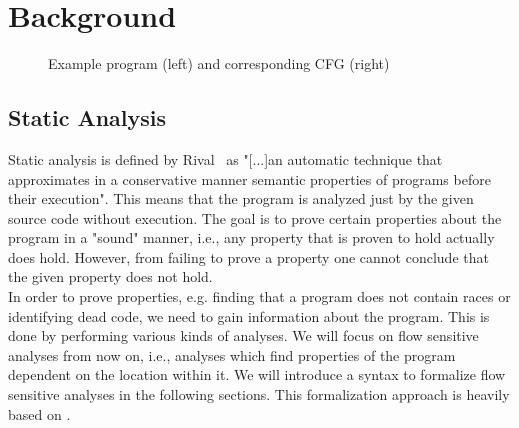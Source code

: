 
\chapter{Background}\label{chapter:background}

\begin{figure}
  \centering
  \begin{subfigure}{.35\textwidth}
    \centering
    
  \end{subfigure}
  \begin{subfigure}{.35\textwidth}
    \centering
  \end{subfigure}
  \caption{Example program (left) and corresponding CFG (right)}
  \label{fig:example_cfg}
\end{figure}

  \section{Static Analysis}
  Static analysis is defined by Rival~\parencite{rival2020introduction} as "[...]an automatic technique that approximates in a conservative manner semantic properties of programs before their execution". This means that the program is analyzed just by the given source code without execution. The goal is to prove certain properties about the program in a "sound" manner, i.e., any property that is proven to hold actually does hold. However, from failing to prove a property one cannot conclude that the given property does not hold.\\
  In order to prove properties, e.g. finding that a program does not contain races or identifying dead code, we need to gain information about the program. This is done by performing various kinds of analyses. We will focus on flow sensitive analyses from now on, i.e., analyses which find properties of the program dependent on the location within it. We will introduce a syntax to formalize flow sensitive analyses in the following sections. This formalization approach is heavily based on \parencite{apinis2012side}.
    
